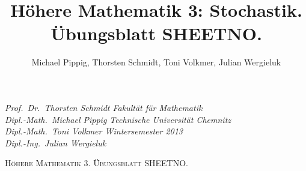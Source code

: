 \documentclass[11pt,a4paper,oldfontcommands,onecolumn,draft]{memoir}
\title{Höhere Mathematik 3: Stochastik. Übungsblatt SHEETNO.}
\author{Michael Pippig, Thorsten Schmidt, Toni Volkmer, Julian Wergieluk}\date{}
\begin{document}
\pagestyle{empty}

{\itshape\small
Prof.\ Dr.\ Thorsten Schmidt \hfill Fakultät für Mathematik \\
Dipl.-Math.\ Michael Pippig \hfill Technische Universität Chemnitz \\
Dipl.-Math.\ Toni Volkmer \hfill Wintersemester 2013 \\
Dipl.-Ing.\ Julian Wergieluk
}


\begin{center}
    {\LARGE\scshape Höhere Mathematik 3. Übungsblatt SHEETNO. \\}
\end{center}

\pagestyle{plain}
\sloppy
\end{document}
